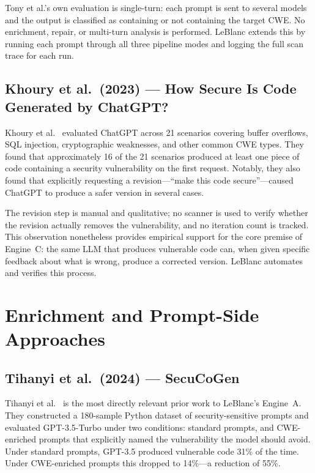 \documentclass[12pt,a4paper]{report}
\begin{document}
Tony et al.'s own evaluation is single-turn: each prompt is sent to several
models and the output is classified as containing or not containing the target
CWE. No enrichment, repair, or multi-turn analysis is performed. LeBlanc extends
this by running each prompt through all three pipeline modes and logging the full
scan trace for each run.

\subsection{Khoury et al.\ (2023) --- How Secure Is Code Generated by ChatGPT?}
\label{ssec:khoury}

Khoury et al.~\cite{khoury2023secure} evaluated ChatGPT across 21 scenarios
covering buffer overflows, SQL injection, cryptographic weaknesses, and
other common CWE types. They found that approximately 16 of the 21 scenarios
produced at least one piece of code containing a security vulnerability on the
first request. Notably, they also found that explicitly requesting a revision---``make
this code secure''---caused ChatGPT to produce a safer version in several cases.

The revision step is manual and qualitative; no scanner is used to verify whether
the revision actually removes the vulnerability, and no iteration count is
tracked. This observation nonetheless provides empirical support for the core
premise of Engine~C: the same LLM that produces vulnerable code can, when given
specific feedback about what is wrong, produce a corrected version. LeBlanc
automates and verifies this process.

\section{Enrichment and Prompt-Side Approaches}
\label{sec:litenrich}

\subsection{Tihanyi et al.\ (2024) --- SecuCoGen}
\label{ssec:secucogen}

Tihanyi et al.~\cite{tihanyi2023secucogenicse} is the most directly relevant
prior work to LeBlanc's Engine~A. They constructed a 180-sample Python dataset
of security-sensitive prompts and evaluated GPT-3.5-Turbo under two conditions:
standard prompts, and CWE-enriched prompts that explicitly named the vulnerability
the model should avoid. Under standard prompts, GPT-3.5 produced vulnerable code
31\% of the time. Under CWE-enriched prompts this dropped to 14\%---a reduction
of 55\%.
\end{document}
